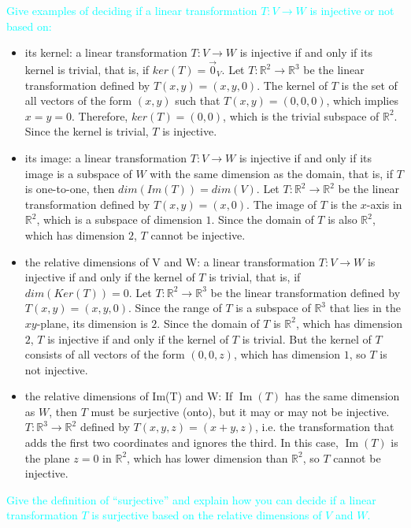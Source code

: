 \documentclass[fontsize=12pt]{scrartcl}
\begin{document}
\bigskip

\noindent
\textcolor{cyan}{Give examples of deciding if a linear transformation $T: V \to W$ is injective or not based on:}
\begin{itemize}
  \item its kernel: a linear transformation $T: V \to W$ is injective if and only if its kernel is trivial, that is, if $ker(T) = {\vec{0}_V}$. Let $T: \mathbb{R}^2 \to \mathbb{R}^3$ be the linear transformation defined by $T(x,y) = (x,y,0)$. The kernel of $T$ is the set of all vectors of the form $(x,y)$ such that $T(x,y) = (0,0,0)$, which implies $x=y=0$. Therefore, $ker(T) = {(0,0)}$, which is the trivial subspace of $\mathbb{R}^2$. Since the kernel is trivial, $T$ is injective.
  \item its image: a linear transformation $T: V \to W$ is injective if and only if its image is a subspace of $W$ with the same dimension as the domain, that is, if $T$ is one-to-one, then $dim(Im(T)) = dim(V)$. Let $T: \mathbb{R}^2 \to \mathbb{R}^2$ be the linear transformation defined by $T(x,y) = (x,0)$. The image of $T$ is the $x$-axis in $\mathbb{R}^2$, which is a subspace of dimension $1$. Since the domain of $T$ is also $\mathbb{R}^2$, which has dimension $2$, $T$ cannot be injective.
  \item the relative dimensions of V and W: a linear transformation $T: V \to W$ is injective if and only if the kernel of $T$ is trivial, that is, if $dim(Ker(T))=0$. Let $T: \mathbb{R}^2 \to \mathbb{R}^3$ be the linear transformation defined by $T(x,y) = (x,y,0)$. Since the range of $T$ is a subspace of $\mathbb{R}^3$ that lies in the $xy$-plane, its dimension is $2$. Since the domain of $T$ is $\mathbb{R}^2$, which has dimension $2$, $T$ is injective if and only if the kernel of $T$ is trivial. But the kernel of $T$ consists of all vectors of the form $(0,0,z)$, which has dimension $1$, so $T$ is not injective.
  \item the relative dimensions of Im(T) and W: If $\operatorname{Im}(T)$ has the same dimension as $W$, then $T$ must be surjective (onto), but it may or may not be injective. $T: \mathbb{R}^3 \rightarrow \mathbb{R}^2$ defined by $T(x,y,z) = (x+y, z)$, i.e. the transformation that adds the first two coordinates and ignores the third. In this case, $\operatorname{Im}(T)$ is the plane $z=0$ in $\mathbb{R}^2$, which has lower dimension than $\mathbb{R}^2$, so $T$ cannot be injective.
  \end{itemize}

\newpage
\noindent
\textcolor{cyan}{Give the definition of ``surjective'' and explain how you can decide if a linear transformation $T$ is surjective based on the relative dimensions of $V$ and $W$.}
\end{document}
